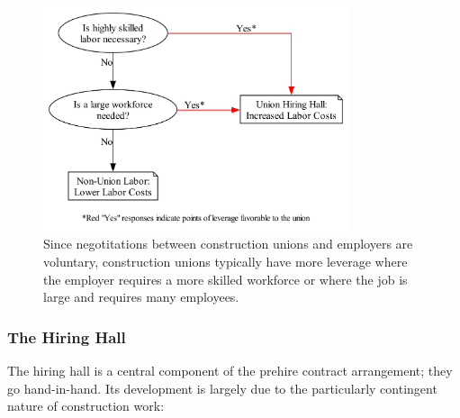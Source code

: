 \documentclass[12pt]{article}
\newcommand{\imageWidth}{0.8\textwidth}
\begin{document}
\begin{figure}[ht]
  \centering
  \includegraphics[width=\imageWidth]{images/union_power_red}
  \captionsetup{justification=centering, singlelinecheck=false, margin=2cm} 
  \caption[Union Leverage and Power]{Since negotitations between construction unions and employers are voluntary, construction unions typically have more leverage where the employer requires a more skilled workforce or where the job is large and requires many employees.}
  \label{fig:union_power_red}
\end{figure}

\subsubsection{The Hiring Hall}

The hiring hall is a central component of the prehire contract arrangement; they go hand-in-hand. Its development is largely due to the particularly contingent nature of construction work:
\end{document}
